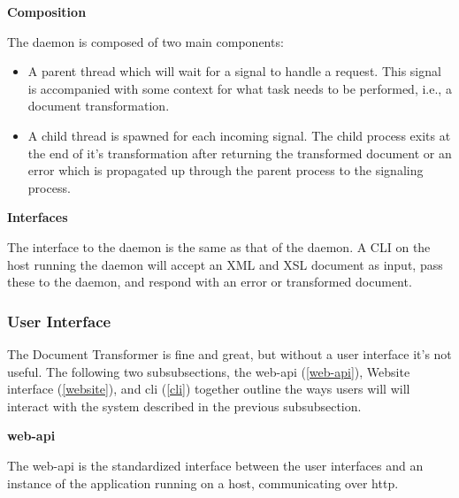 \textbf{Composition}

The daemon is composed of two main components:

\begin{itemize}
  \item {
    A parent thread which will wait for a signal to handle a request.
    This signal is accompanied with some context for what task needs to be performed, i.e., a document transformation.
  }
  \item {
    A child thread is spawned for each incoming signal.
    The child process exits at the end of it's transformation after returning the transformed document or an error which is propagated up through the parent process to the signaling process.
  }
\end{itemize}

\textbf{Interfaces}

The interface to the daemon is the same as that of the daemon.
A CLI on the host running the daemon will accept an XML and XSL document as input, pass these to the daemon, and respond with an error or transformed document.

\subsubsection{User Interface}
\label{user-interface}

The Document Transformer is fine and great, but without a user interface it's not useful.
The following two subsubsections, the \gls{web-api} (\ref{web-api}), Website interface (\ref{website}), and \gls{cli} (\ref{cli}) together outline the ways users will will interact with the system described in the previous subsubsection.

\textbf{\gls{web-api}}
\label{web-api}

The \gls{web-api} is the standardized interface between the user interfaces and an instance of the application running on a host, communicating over \gls{http}.

